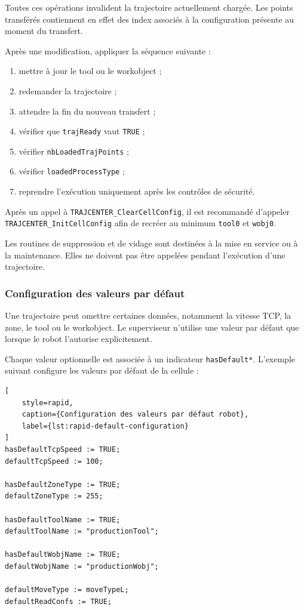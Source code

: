 \documentclass{rapportENSAM}
\begin{document}
Toutes ces opérations invalident la trajectoire actuellement chargée. Les
points transférés contiennent en effet des index associés à la configuration
présente au moment du transfert.

Après une modification, appliquer la séquence suivante :

\begin{enumerate}
    \item mettre à jour le tool ou le workobject ;
    \item redemander la trajectoire ;
    \item attendre la fin du nouveau transfert ;
    \item vérifier que \texttt{trajReady} vaut \texttt{TRUE} ;
    \item vérifier \texttt{nbLoadedTrajPoints} ;
    \item vérifier \texttt{loadedProcessType} ;
    \item reprendre l'exécution uniquement après les contrôles de sécurité.
\end{enumerate}

Après un appel à \texttt{TRAJCENTER\_ClearCellConfig}, il est recommandé
d'appeler \texttt{TRAJCENTER\_InitCellConfig} afin de recréer au minimum
\texttt{tool0} et \texttt{wobj0}.

Les routines de suppression et de vidage sont destinées à la mise en service
ou à la maintenance. Elles ne doivent pas être appelées pendant l'exécution
d'une trajectoire.


\subsubsection{Configuration des valeurs par défaut}
\label{subsubsec:rapid-default-values}

Une trajectoire peut omettre certaines données, notamment la vitesse TCP, la
zone, le tool ou le workobject. Le superviseur n'utilise une valeur par défaut
que lorsque le robot l'autorise explicitement.

Chaque valeur optionnelle est associée à un indicateur
\texttt{hasDefault*}. L'exemple suivant configure les valeurs par défaut de la
cellule :

\begin{lstlisting}[
    style=rapid,
    caption={Configuration des valeurs par défaut robot},
    label={lst:rapid-default-configuration}
]
hasDefaultTcpSpeed := TRUE;
defaultTcpSpeed := 100;

hasDefaultZoneType := TRUE;
defaultZoneType := 255;

hasDefaultToolName := TRUE;
defaultToolName := "productionTool";

hasDefaultWobjName := TRUE;
defaultWobjName := "productionWobj";

defaultMoveType := moveTypeL;
defaultReadConfs := TRUE;
\end{lstlisting}
\end{document}
